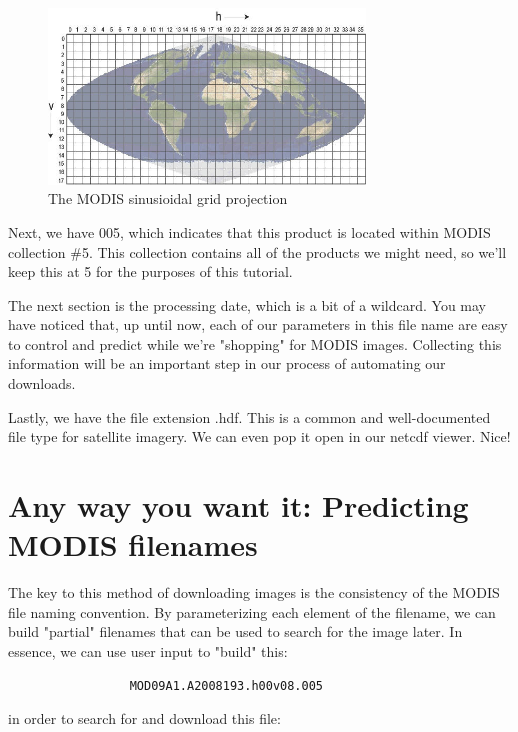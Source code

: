 \documentclass{book}
\theoremstyle{aside_style}
\begin{document}
\begin{figure}[H]
\centering
\includegraphics[width=0.75\textwidth]{images/modis_sinusoidal_grid}
\caption{The MODIS sinusioidal grid projection}
\label{modgrid}
\end{figure}

\pagebreak
Next, we have 005, which indicates that this product is located within MODIS collection \#5. This collection contains all of the products
we might need, so we'll keep this at 5 for the purposes of this tutorial. 

The next section is the processing date, which is a bit of a wildcard. You may have noticed that, up until now, each of our parameters in this
file name are easy to control and predict while we're "shopping" for MODIS images. Collecting this information will be an important step 
in our process of automating our downloads.

Lastly, we have the file extension .hdf. This is a common and well-documented file type for satellite imagery. We can even pop it open in our 
netcdf viewer. Nice!

\section{Any way you want it: Predicting MODIS filenames}

The key to this method of downloading images is the consistency of the MODIS file naming convention. 
By parameterizing each element of the filename, we can build "partial" filenames that can be used to search for the image later.
In essence, we can use user input to "build" this:

\begin{lstlisting}
                 MOD09A1.A2008193.h00v08.005
\end{lstlisting}

in order to search for and download this file:
\end{document}
